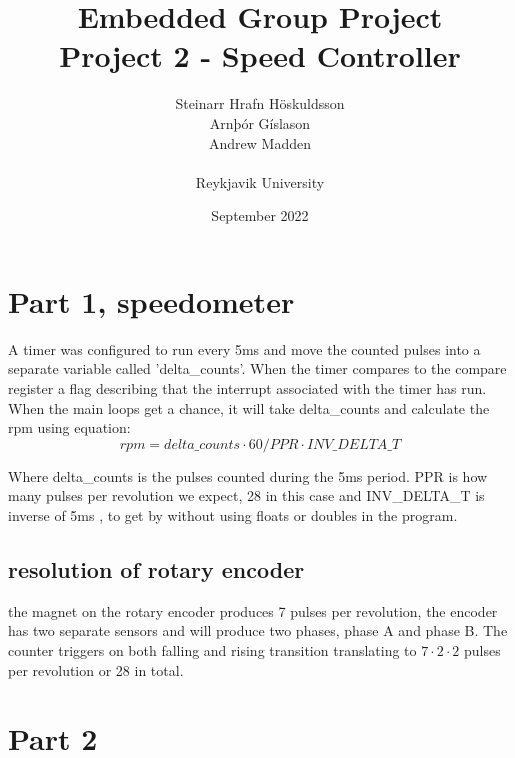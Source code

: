 \documentclass{article}
\title{Embedded Group Project\\ \large Project 2 - Speed Controller}
\author{Steinarr Hrafn Höskuldsson\\
Arnþór Gíslason\\
Andrew Madden\\
\\
Reykjavik University}
\date{September 2022}
\newcommand{\mycomment}[1]{}
\newcommand{\timerinterval}{5ms }
\begin{document}
\maketitle
\mycomment{
\begin{figure}[h]
    \centering
    \texttt{[image: LAB3/Basic1.png]}
    \caption{"Switch test" Breadboard set up}
    \label{fig:Switch_test}
\end{figure}



}

\section{Part 1, speedometer}
A timer was configured to run every \timerinterval and move the counted pulses into a separate variable called 'delta\_counts'. When the timer compares to the compare register a flag describing that the interrupt associated with the timer has run. 
When the main loops get a chance, it will take delta\_counts and calculate the rpm using equation: 
\begin{equation}
     rpm = delta\_counts \cdot 60 / PPR \cdot INV\_DELTA\_T
\end{equation}

Where delta\_counts is the pulses counted during the \timerinterval period. PPR is how many pulses per revolution we expect, 28 in this case and INV\_DELTA\_T is inverse of \timerinterval, to get by without using floats or doubles in the program.

\subsection{resolution of rotary encoder}
    the magnet on the rotary encoder produces 7 pulses per revolution, the encoder has two separate sensors and will produce two phases, phase A and phase B. The counter triggers on both falling and rising transition translating to $7\cdot2\cdot2$  pulses per revolution or 28 in total. 

\section{Part 2}
\end{document}
